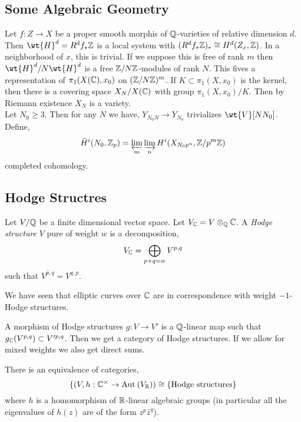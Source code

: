 \documentclass[12pt]{article}
\begin{document}
\subsection{Some Algebraic Geometry}

Let $f : Z \to X$ be a proper smooth morphis of $\mathbb{Q}$-varieties of relative dimension $d$. Then $\wt{H}^d = R^d f_* \Z$ is a local system with $(R^d f_* \mathbb{Z})_* \cong H^d(Z_x, \mathbb{Z})$. In a neighborhood of $x$, this is trivial. If we suppose this is free of rank $m$ then $\wt{H}^d / N \wt{H}^d$ is a free $\mathbb{Z} / N \mathbb{Z}$-modules of rank $N$. This fives a representation of $\pi_1(X(\mathbb{C}), x_0)$ on $(\mathbb{Z} / N \mathbb{Z})^m$. If $K \subset \pi_1(X, x_0)$ is the kernel, then there is a covering space $X_N / X(\mathbb{C})$ with group $\pi_1(X, x_0) / K$. Then by Riemann existence $X_N$ is a variety. 
\bigskip\\
Let $N_0 \ge 3$. Then for any $N$ we have, $Y_{N_0 N} \to Y_{N_0}$ trivializes $\wt{V}[N N_0]$. 
\bigskip\\
Define,
\[ \hat{H}^i(N_0, \mathbb{Z}_p) = \varprojlim_m \varinjlim_n H^i(X_{N_0 p^n}, \mathbb{Z} / p^m \mathbb{Z}) \]
completed cohomology. 

\subsection{Hodge Structres}

\begin{defn}
Let $V / \mathbb{Q}$ be a finite dimensional vector space. Let $V_{\mathbb{C}} = V \otimes_{\mathbb{Q}} \mathbb{C}$. A \textit{Hodge structure} $V$ pure of weight $w$ is a decomposition,
\[ V_{\mathbb{C}} = \bigoplus_{p + q = w} V^{p,q} \]
such that $\overline{V^{p,q}} = V^{q,p}$. 
\end{defn}

\begin{rmk}
We have seen that elliptic curves over $\mathbb{C}$ are in correspondence with weight $-1$-Hodge structures. 
\end{rmk}

\begin{defn}
A morphism of Hodge structures $g : V \to V'$ is a $\mathbb{Q}$-linear map such that $g_{\mathbb{C}}(V^{p,q}) \subset V'^{p,q}$. Then we get a category of Hodge structures. If we allow for mixed weights we also get direct sums. 
\end{defn}

\begin{prop}
There is an equivalence of categories,
\[ \{ (V, h : \mathbb{C}^\times \to \mathrm{Aut}_{} \left( V_{\mathbb{R}} \right)) \cong \{ \text{Hodge structures} \} \]
where $h$ is a homomorphism of $\mathbb{R}$-linear algebraic groups (in particular all the eigenvalues of $h(z)$ are of the form $z^p \bar{z}^q$). 
\end{prop}
\end{document}

